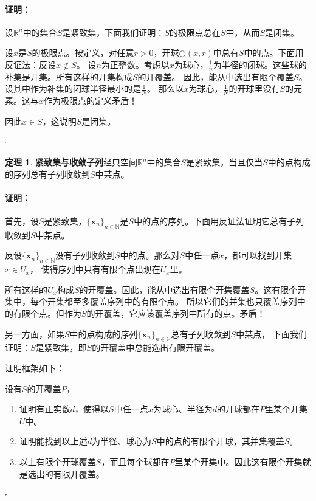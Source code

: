 \documentclass[12pt,UTF8]{ctexbook}
\theoremstyle{definition}
\newtheorem{tm}{定理}[section]
\theoremstyle{plain}
\renewenvironment{proof}{\paragraph{\textbf{证明：}}}{\hfill$\square$}
\begin{document}
\begin{appendix}
\begin{proof}
    设$\mathbb{R}^n$中的集合$S$是紧致集，下面我们证明：$S$的极限点总在$S$中，从而$S$是闭集。

    设$x$是$S$的极限点。按定义，对任意$r>0$，开球$\bigcirc(x, r)$中总有$S$中的点。下面用反证法：反设$x\notin S$。
    设$n$为正整数。考虑以$x$为球心，$\frac{1}{n}$为半径的闭球。这些球的补集是开集。所有这样的开集构成$S$的开覆盖。
    因此，能从中选出有限个覆盖$S$。设其中作为补集的闭球半径最小的是$\frac{1}{N}$。
    那么以$x$为球心，$\frac{1}{N}$的开球里没有$S$的元素。这与$x$作为极限点的定义矛盾！

    因此$x\in S$，这说明$S$是闭集。

\end{proof}

\begin{tm}{\textbf{紧致集与收敛子列}}\label{tm:b-2-20}
    经典空间$\mathbb{R}^n$中的集合$S$是紧致集，当且仅当$S$中的点构成的序列总有子列收敛到$S$中某点。
\end{tm}

\begin{proof}
    首先，设$S$是紧致集，$\{\mathbf{x}_n\}_{n\in\mathbb{N}}$是$S$中的点的序列。下面用反证法证明它总有子列收敛到$S$中某点。

    反设$\{\mathbf{x}_n\}_{n\in\mathbb{N}}$没有子列收敛到$S$中的点。那么对$S$中任一点$x$，都可以找到开集$x\in U_x$，
    使得序列中只有有限个点出现在$U_x$里。

    所有这样的$U_x$构成$S$的开覆盖。因此，能从中选出有限个开集覆盖$S$。这有限个开集中，每个开集都至多覆盖序列中的有限个点。
    所以它们的并集也只覆盖序列中的有限个点。但作为$S$的开覆盖，它应该覆盖序列中所有的点。矛盾！
    
    另一方面，如果$S$中的点构成的序列$\{\mathbf{x}_n\}_{n\in\mathbb{N}}$总有子列收敛到$S$中某点，
    下面我们证明：$S$是紧致集，即$S$的开覆盖中总能选出有限开覆盖。

    证明框架如下：

    设有$S$的开覆盖$P$，
    \begin{enumerate}
        \item 证明有正实数$d$，使得以$S$中任一点$x$为球心、半径为$d$的开球都在$P$里某个开集$U$中。
        \item 证明能找到以上述$d$为半径、球心为$S$中的点的有限个开球，其并集覆盖$S$。
        \item 以上有限个开球覆盖$S$，而且每个球都在$P$里某个开集中。因此这有限个开集就是选出的有限开覆盖。
    \end{enumerate}


\end{proof}
\end{appendix}
\end{document}
